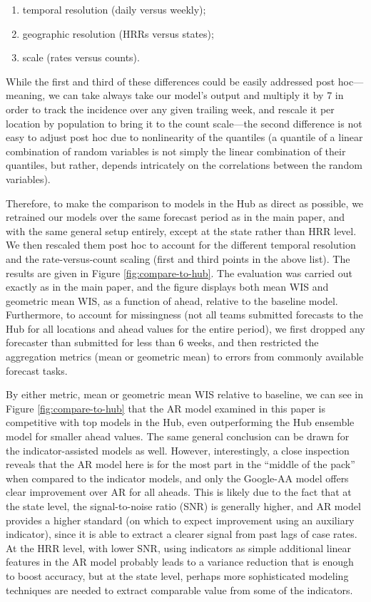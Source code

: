 \begin{enumerate}
\item temporal resolution (daily versus weekly);
\item geographic resolution (HRRs versus states); 
\item scale (rates versus counts).
\end{enumerate}

While the first and third of these differences could be easily addressed post 
hoc---meaning, we can take always take our model's output and multiply it by 
7 in order to track the incidence over any given trailing week, and rescale it
per location by population to bring it to the count scale---the second
difference is not easy to adjust post hoc due to nonlinearity of the quantiles
(a quantile of a linear combination of random variables is not simply the linear
combination of their quantiles, but rather, depends intricately on the
correlations between the random variables).    

Therefore, to make the comparison to models in the Hub as direct as possible, we
retrained our models over the same forecast period as in the main paper, and
with the same general setup entirely, except at the state rather than HRR level.
We then rescaled them post hoc to account for the different temporal resolution
and the rate-versus-count scaling (first and third points in the above list).
The 
results are given in Figure \ref{fig:compare-to-hub}.  The evaluation was
carried out exactly as in the main paper, and the figure displays both mean WIS
and geometric mean WIS, as a function of ahead, relative to the baseline model.
Furthermore, to account for missingness (not all teams submitted forecasts to
the Hub for all locations and ahead values for the entire period), we first
dropped any forecaster than submitted for less than 6 weeks, and then restricted
the aggregation metrics (mean or geometric mean) to errors from commonly
available forecast tasks.

By either metric, mean or geometric mean WIS relative to baseline, we can see  
in Figure \ref{fig:compare-to-hub} that the AR model examined in this paper is 
competitive with top models in the Hub, even outperforming the Hub ensemble
model for smaller ahead values.  The same general conclusion can be drawn for
the indicator-assisted models as well.  However, interestingly, a close inspection
reveals that the AR model here is for the most part in the ``middle of the
pack'' when compared to the indicator models, and only the Google-AA model
offers clear improvement over AR for all aheads.  This is likely due to the fact
that at the state level, the signal-to-noise ratio (SNR) is generally higher,
and AR model provides a higher standard (on which to expect improvement using an 
auxiliary indicator), since it is able to extract a clearer signal from past
lags of case rates.  At the HRR level, with lower SNR, using indicators as
simple additional linear features in the AR model probably leads to a variance
reduction that is enough to boost accuracy, but at the state level, perhaps more
sophisticated modeling techniques are needed to extract comparable value from
some of the indicators.

